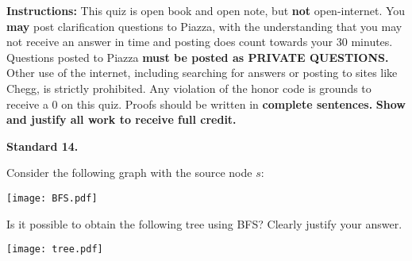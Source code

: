 \documentclass[11pt]{article}
\begin{document}
\renewcommand{\headrulewidth}{0.5pt}

\phantom{Test}

\begin{small}
\noindent \textbf{Instructions:} This quiz is open book and open note, but \textbf{not} open-internet. You \textbf{may} post clarification questions to Piazza, with the understanding that you may not receive an answer in time and posting does count towards your 30 minutes. Questions posted to Piazza \textbf{must be posted as PRIVATE QUESTIONS.} Other use of the internet, including searching for answers or posting to sites like Chegg, is strictly prohibited. Any violation of the honor code is grounds to receive a 0 on this quiz. Proofs should be written in \textbf{complete sentences.} \textbf{Show and justify all work to receive full credit.}
\end{small} 

\hrulefill 

	\noindent \textbf{Standard 14.} \itshape{Consider the following graph with the source node $s$:
	
\begin{center}
\noindent \texttt{[image: BFS.pdf]}
\end{center}


	Is it possible to obtain the following tree using BFS? Clearly justify your answer.
	
	
	\begin{center}
\noindent \texttt{[image: tree.pdf]}
\end{center}
}
	
	
\end{document}
